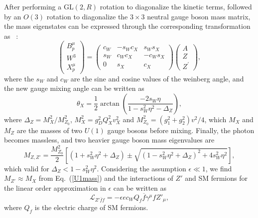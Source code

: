 \documentclass[preprint, superscriptaddress,amsmath, nofootinbib]{revtex4-1}
\begin{document}
{After performing a GL$(2, R)$ rotation to diagonalize the kinetic terms, followed by an $\textit{O}(3)$ rotation to diagonalize the $3\times 3$ neutral gauge boson mass matrix, the mass eigenstates can be expressed through the corresponding transformation as~\cite{Filimonova:2022pkj} :
\begin{equation}
\left(
\begin{array}{cc}
    B_{p}^{\mu}  \\
    W^3  \\
    X_{p}^{\mu}
\end{array}
\right)
=
\left(
\begin{array}{ccc}
     c_W & -s_W c_X & s_W s_X \\
     s_W & c_W c_X & -c_W s_X \\
     0 & s_X & c_X
\end{array}
\right)
\left(
\begin{array}{ccc}
     A  \\
     Z  \\
     Z^\prime
\end{array}
\right),
\end{equation}
where the $s_W $ and $c_W$ are the sine and cosine values of the weinberg angle, and the new gauge mixing angle can be written as 
\begin{equation}
    \theta_X = \frac{1}{2}\arctan(\frac{-2s_W\eta}{1-s_W^2\eta^2-\Delta_Z}),
\end{equation}
where $\Delta_Z = M_X^2/M_{Z_{0}}^2$, $M^2_{X} = g^2_{D}Q^2_{X}v_{X}^2 $ and $M^2_{Z_{0}} = (g^2_{1}+g^2_{2}) v^2/4$, which $ M_X$ and $M_Z$ are the masses of two $U(1)$ gauge bosons before mixing. Finally, the photon becomes massless, and two heavier gauge boson mass eigenvalues are
\begin{equation}
    M_{Z,Z'} = \frac{M_{Z_{0}}^2}{2}[(1+s_W^2\eta^2+\Delta_Z)\pm\sqrt{(1-s_W^2\eta^2+\Delta_Z)^2+4s_W^2\eta^2}], 
    \label{U1mass}
\end{equation} 
which valid for $\Delta_Z < 1-s_W^2\eta^2$. Considering the assumption $\epsilon \ll 1$, we find $M_{Z'} \approx M_X$ from Eq.~(\ref{U1mass}) and the interactions of $Z'$ and SM fermions for the linear order approximation in $\epsilon$ can be written as  
\begin{equation}
    \mathcal{L}_{Z'\overline{f}f} = -\epsilon{e}{c_W}{Q_f}\overline{f}\gamma^{\mu}f Z'_\mu,
    \label{Lzff}
\end{equation}
where $Q_f$ is the electric charge of SM fermions. 


}
\end{document}
